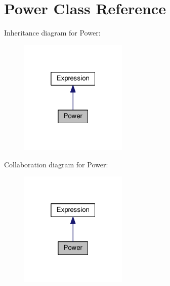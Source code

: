 \hypertarget{classPower}{}\section{Power Class Reference}
\label{classPower}


Inheritance diagram for Power\+:\nopagebreak
\begin{figure}[H]
\begin{center}
\leavevmode
\includegraphics[width=145pt]{classPower__inherit__graph}
\end{center}
\end{figure}


Collaboration diagram for Power\+:\nopagebreak
\begin{figure}[H]
\begin{center}
\leavevmode
\includegraphics[width=145pt]{classPower__coll__graph}
\end{center}
\end{figure}
